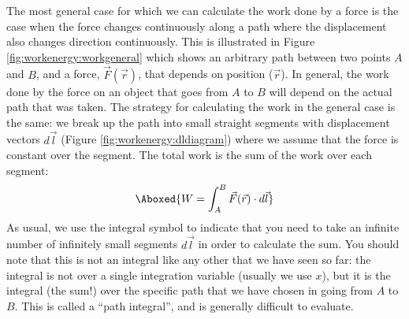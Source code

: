 The most general case for which we can calculate the work done by a force is the case when the force changes continuously along a path where the displacement also changes direction continuously. This is illustrated in Figure \ref{fig:workenergy:workgeneral} which shows an arbitrary path between two points $A$ and $B$, and a force, $\vec F(\vec r)$, that depends on position ($\vec r$). In general, the work done by the force on an object that goes from $A$ to $B$ will depend on the actual path that was taken.
The strategy for calculating the work in the general case is the same: we break up the path into small straight segments with displacement vectors $d\vec l$ (Figure \ref{fig:workenergy:dldiagram}) where we assume that the force is constant over the segment. The total work is the sum of the work over each segment:
\begin{align}
\Aboxed{W = \int_A^B \vec F(\vec r) \cdot d\vec l}
\end{align}
As usual, we use the integral symbol to indicate that you need to take an infinite number of infinitely small segments $d\vec l$ in order to calculate the sum.
You should note that this is not an integral like any other that we have seen so far: the integral is not over a single integration variable (usually we use $x$), but it is the integral (the sum!) over the specific path that we have chosen in going from $A$ to $B$. This is called a ``path integral'', and is generally difficult to evaluate. 
